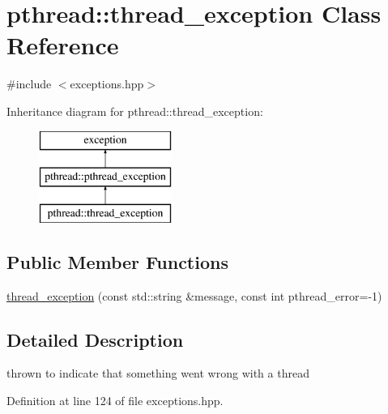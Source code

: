 \hypertarget{classpthread_1_1thread__exception}{\section{pthread\+:\+:thread\+\_\+exception Class Reference}
\label{classpthread_1_1thread__exception}
}


{\ttfamily \#include $<$exceptions.\+hpp$>$}

Inheritance diagram for pthread\+:\+:thread\+\_\+exception\+:\begin{figure}[H]
\begin{center}
\leavevmode
\includegraphics[height=3.000000cm]{classpthread_1_1thread__exception}
\end{center}
\end{figure}
\subsection*{Public Member Functions}
\begin{DoxyCompactItemize}
\item 
\hyperlink{classpthread_1_1thread__exception_acdaadcbdcd315d86a4466d1be460a7b7}{thread\+\_\+exception} (const std\+::string \&message, const int pthread\+\_\+error=-\/1)
\end{DoxyCompactItemize}


\subsection{Detailed Description}
thrown to indicate that something went wrong with a thread 

Definition at line 124 of file exceptions.\+hpp.



